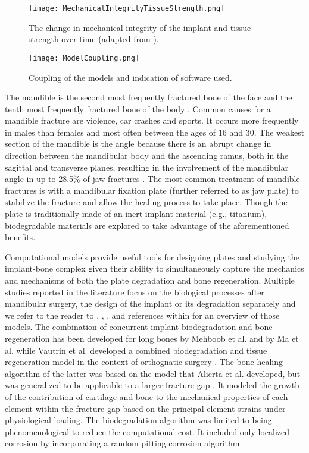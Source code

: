 \begin{figure}[ht]
    \centering
    \texttt{[image: MechanicalIntegrityTissueStrength.png]}
    \caption[The change in mechanical integrity of the implant and tissue strength over time]{The change in mechanical integrity of the implant and tissue strength over time (adapted from \cite{KChen}).}
    \label{fig:rateofdeg}
\end{figure}

\begin{figure}[ht]
    \centering
    \texttt{[image: ModelCoupling.png]}
    \caption{Coupling of the models and indication of software used.}
    \label{fig:ModelCoupling}
\end{figure}

The mandible is the second most frequently fractured bone of the face and the tenth most frequently fractured bone of the body \cite{Bhavik}. Common causes for a mandible fracture are violence, car crashes and sports. It occurs more frequently in males than females and most often between the ages of 16 and 30. The weakest section of the mandible is the angle because there is an abrupt change in direction between the mandibular body and the ascending ramus, both in the sagittal and transverse planes, resulting in the involvement of the mandibular angle in up to 28.5\% of jaw fractures \cite{Levy}. The most common treatment of mandible fractures is with a mandibular fixation plate (further referred to as jaw plate) to stabilize the fracture and allow the healing process to take place. Though the plate is traditionally made of an inert implant material (e.g., titanium), biodegradable materials are explored to take advantage of the aforementioned benefits. 

Computational models provide useful tools for designing plates and studying the implant-bone complex given their ability to simultaneously capture the mechanics and mechanisms of both the plate degradation and bone regeneration. Multiple studies reported in the literature focus on the biological processes after mandibular surgery, the design of the implant or its degradation separately and we refer to the reader to \cite{Vautrin2021}, \cite{Zheng2019}, \cite{Wu2020}, \cite{Boccaccio2008} and references within for an overview of those models. The combination of concurrent implant biodegradation and bone regeneration has been developed for long bones by Mehboob et al. \cite{Mehboob2015} and by Ma et al. \cite{Ma2018} while Vautrin et al. developed a combined biodegradation and tissue regeneration model in the context of orthognatic surgery \cite{Vautrin2021}. The bone healing algorithm of the latter was based on the model that Alierta et al. developed, but was generalized to be applicable to a larger fracture gap \cite{Alierta2013}. It modeled the growth of the contribution of cartilage and bone to the mechanical properties of each element within the fracture gap based on the principal element strains under physiological loading. The biodegradation algorithm was limited to being phenomenological to reduce the computational cost. It included only localized corrosion by incorporating a random pitting corrosion algorithm. 

